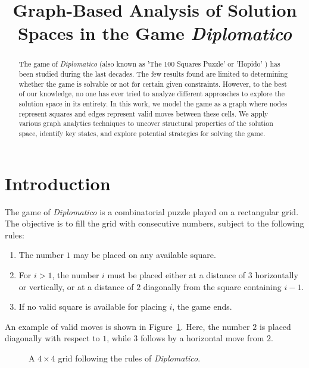 \documentclass[conference]{IEEEtran}
\title{\huge Graph-Based Analysis of Solution Spaces in the Game \textit{Diplomatico}}
\author{
    \IEEEauthorblockN{Filippo Garagnani}
    \IEEEauthorblockA{
        Dipartimento di Ingegneria "Enzo Ferrari" \\
        Università degli Studi di Modena e Reggio Emilia \\
        \texttt{298707@studenti.unimore.it}
    }
}
\begin{document}
\maketitle

\begin{abstract}
The game of \textit{Diplomatico} (also known as 'The 100 Squares Puzzle' or 'Hopido' \cite{hopido}) has been studied during the last decades. 
The few results found are limited to determining whether the game is solvable or not for certain given constraints.
However, to the best of our knowledge, no one has ever tried to analyze different approaches to explore the solution space in its entirety.
In this work, we model the game as a graph where nodes represent squares and edges represent valid moves between these cells. 
We apply various graph analytics techniques to uncover structural properties of the solution space, identify key states, and explore potential strategies for solving the game.
\end{abstract}


\section{Introduction}
The game of \textit{Diplomatico} is a combinatorial puzzle played on a rectangular grid. 
The objective is to fill the grid with consecutive numbers, subject to the following rules:
\begin{enumerate}
	\item The number $1$ may be placed on any available square.
	\item For $i > 1$, the number $i$ must be placed either at a distance of $3$ horizontally or vertically, or at a distance of $2$ diagonally from the square containing $i-1$.
	\item If no valid square is available for placing $i$, the game ends.
\end{enumerate}

An example of valid moves is shown in Figure~\ref{fig:example_moves}. 
Here, the number $2$ is placed diagonally with respect to $1$, while $3$ follows by a horizontal move from $2$.

\begin{figure}[ht]
	\centering
	\caption{A $4 \times 4$ grid following the rules of \textit{Diplomatico}.}
	\label{fig:example_moves}
\end{figure}
\end{document}

